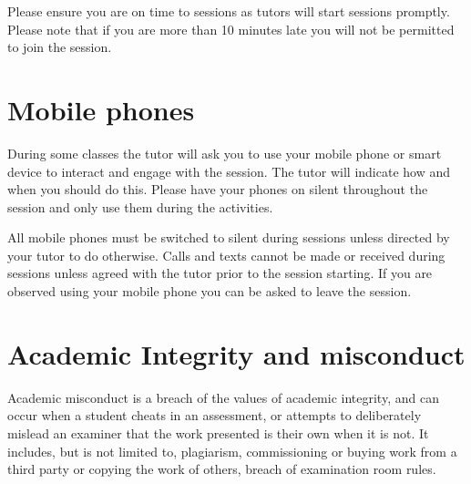 \documentclass{MDXHandbook}
\begin{document}
Please ensure you are on time to sessions as tutors will start sessions promptly.  Please note that if you are more than 10 minutes late you will not be permitted to join the session. 



\section*{Mobile phones}

During some classes the tutor will ask you to use your mobile phone or smart device to interact and engage with the session. The tutor will indicate how and when you should do this. Please have your phones on silent throughout the session and only use them during the activities.


All mobile phones must be switched to silent during sessions unless directed by your tutor to do otherwise.  Calls and texts cannot be made or received during sessions unless agreed with the tutor prior to the session starting.  If you are observed using your mobile phone you can be asked to leave the session.  

\section*{Academic Integrity and misconduct}
Academic misconduct is a breach of the values of academic integrity, and can occur when a student cheats in an assessment, or attempts to deliberately mislead an examiner that the work presented is their own when it is not. It includes, but is not limited to, plagiarism, commissioning or buying work from a third party or copying the work of others, breach of examination room rules.
\end{document}
